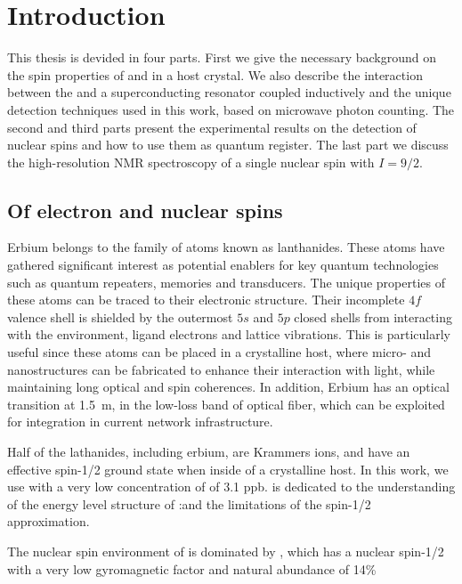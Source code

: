 \setchapterpreamble[u]{\margintoc}
\chapter{Introduction}


This thesis is devided in four parts. First we give the necessary background on the spin properties of \Er and \W in a \Ca host crystal. We also describe the interaction between the \Er and a superconducting resonator coupled inductively and the unique detection techniques used in this work, based on microwave photon counting. The second and third parts present the experimental results on the detection of \W nuclear spins and how to use them as quantum register. The last part we discuss the high-resolution NMR spectroscopy of a single \Nb nuclear spin with $I=9/2$.

\section{Of electron and nuclear spins}

Erbium belongs to the family of atoms known as lanthanides. These atoms have gathered significant interest as potential enablers for key quantum technologies such as quantum repeaters, memories and transducers. The unique properties of these atoms can be traced to their electronic structure. Their incomplete $4f$ valence shell is shielded by the outermost $5s$ and $5p$ closed shells from interacting with the environment, ligand electrons and lattice vibrations. This is particularly useful since these atoms can be placed in a crystalline host, where micro- and nanostructures can be fabricated to enhance their interaction with light, while maintaining long optical and spin coherences. In addition, Erbium has an optical transition at 1.5~\textmu m, in the low-loss band of optical fiber, which can be exploited for integration in current network infrastructure.

Half of the lathanides, including erbium, are Krammers ions, and have an effective spin-1/2 ground state when inside of a crystalline host. In this work, we use \Ca with a very low concentration of \Er of 3.1 ppb.  is dedicated to the understanding of the energy level structure of \Er:\Ca and the limitations of the spin-1/2 approximation.

The nuclear spin environment of \Ca is dominated by \W, which has a nuclear spin-1/2 with a very low gyromagnetic factor and natural abundance of 14\%

